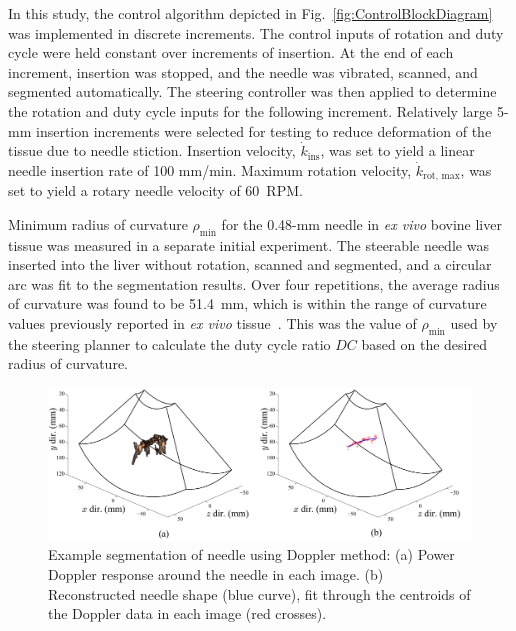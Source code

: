 In this study, the control algorithm depicted in Fig.~\ref{fig:ControlBlockDiagram} was implemented in discrete increments. The control inputs of rotation and duty cycle were held constant over increments of insertion. At the end of each increment, insertion was stopped, and the needle was vibrated, scanned, and segmented automatically. The steering controller was then applied to determine the rotation and duty cycle inputs for the following increment. Relatively large 5-mm insertion increments were selected for testing to reduce deformation of the tissue due to needle stiction. Insertion velocity, $\dot{k}_\text{ins}$, was set to yield a linear needle insertion rate of 100 mm/min. Maximum rotation velocity, $\dot{k}_\text{rot, max}$, was set to yield a rotary needle velocity of 60~RPM.

Minimum radius of curvature $\rho_{\text{min}}$ for the 0.48-mm needle in \textit{ex vivo} bovine liver tissue was measured in a separate initial experiment. The steerable needle was inserted into the liver without rotation, scanned and segmented, and a circular arc was fit to the segmentation results. Over four repetitions, the average radius of curvature was found to be 51.4~mm, which is within the range of curvature values previously reported in \textit{ex vivo} tissue~\cite{Majewicz2012}. This was the value of $\rho_{\text{min}}$ used by the steering planner to calculate the duty cycle ratio $DC$ based on the desired radius of curvature.

\begin{figure}[!t]
\centering
\includegraphics[width=\textwidth]{Images/Chapter2/DopplerVisualization/Doppler3D}%
\caption[Example segmentation of needle using Doppler method]{Example segmentation of needle using Doppler method: (a) Power Doppler response around the needle in each image. (b) Reconstructed needle shape (blue curve), fit through the centroids of the Doppler data in each image (red crosses).}
\label{fig:SegmentationExample}
\end{figure}   
 
